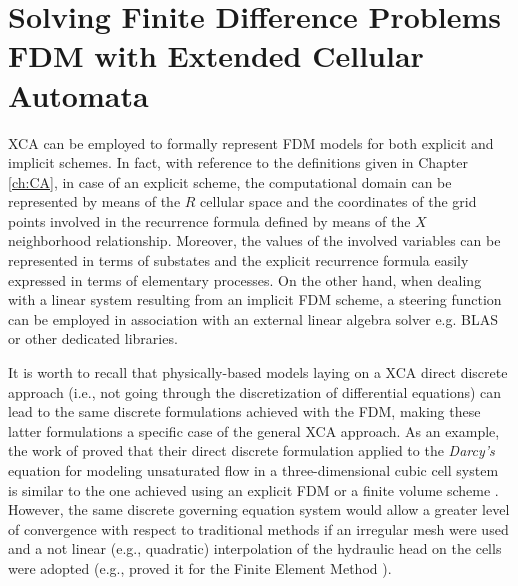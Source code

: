         
\section[Solving FDM with XCA]{Solving Finite Difference Problems FDM with Extended Cellular Automata}
XCA can be employed to formally represent FDM models for both explicit and implicit schemes. 
In fact, with reference to the definitions given in Chapter \ref{ch:CA}, in case of an explicit scheme, the computational domain can be represented by means of the $R$ cellular space and the coordinates of the grid
points involved in the recurrence formula defined by means of the $X$ neighborhood relationship.
Moreover, the values of the involved variables can be represented in terms of substates and the explicit recurrence formula easily expressed in terms of elementary processes.
On the other hand, when dealing with a linear system resulting from an implicit FDM scheme, a steering function can be employed in association with an external linear algebra solver e.g. BLAS\cite{2002:USB:567806.567807} or other dedicated libraries\cite{Kestur:2010:BCF:1848074.1848496}.

It is worth to recall that physically-based models laying on a XCA  direct discrete approach (i.e., not going through the  discretization of differential equations) can lead to the same discrete formulations achieved with the FDM, making these latter formulations a specific case of the general XCA approach.
As an example, the work of \citeauthor{Mendicino:2006} proved that their direct discrete formulation applied to the \textit{Darcy's} equation for modeling unsaturated flow in a three-dimensional cubic cell system is similar to the one achieved using an explicit FDM or a finite volume scheme \cite{Mendicino:2006}.
However, the same discrete governing equation system would allow a greater level of convergence with respect to traditional methods if an irregular mesh were used and a not linear (e.g., quadratic) interpolation of the hydraulic head on the cells were adopted (e.g., \citeauthor{Tonti2001237} proved it for the Finite  Element Method \cite{Tonti2001237}). 
